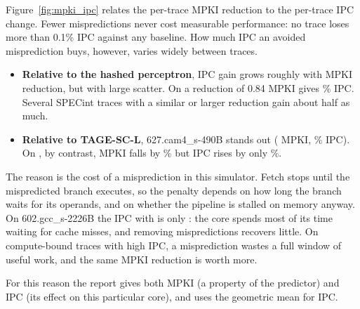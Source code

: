 Figure~\ref{fig:mpki_ipc} relates the per-trace MPKI reduction to the per-trace IPC change. Fewer mispredictions never cost measurable performance: no trace loses more than 0.1\% IPC against any baseline. How much IPC an avoided misprediction buys, however, varies widely between traces.
\begin{itemize}
\item \textbf{Relative to the hashed perceptron}, IPC gain grows roughly with MPKI reduction, but with large scatter. On  a reduction of 0.84 MPKI gives \% IPC. Several SPECint traces with a similar or larger reduction gain about half as much.
\item \textbf{Relative to TAGE-SC-L}, 627.cam4\_s-490B stands out ( MPKI, \% IPC). On , by contrast, MPKI falls by \% but IPC rises by only \%.
\end{itemize}

The reason is the cost of a misprediction in this simulator. Fetch stops until the mispredicted branch executes, so the penalty depends on how long the branch waits for its operands, and on whether the pipeline is stalled on memory anyway. On 602.gcc\_s-2226B the IPC with \prop{} is only : the core spends most of its time waiting for cache misses, and removing mispredictions recovers little. On compute-bound traces with high IPC, a misprediction wastes a full window of useful work, and the same MPKI reduction is worth more.

For this reason the report gives both MPKI (a property of the predictor) and IPC (its effect on this particular core), and uses the geometric mean for IPC.
